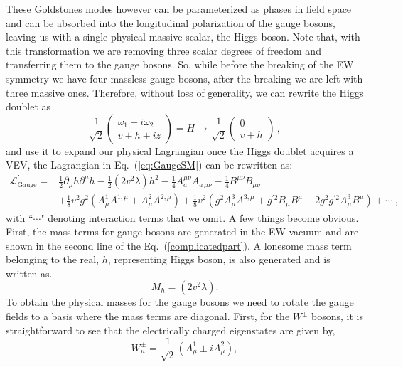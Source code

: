 \documentclass[10pt]{report}
\begin{document}
These Goldstones modes however can be parameterized as phases in field space and can be absorbed into  the longitudinal polarization of the gauge bosons, leaving us with a single physical massive scalar, the Higgs boson. 
%
Note that, with this transformation we are removing three scalar degrees of freedom and transferring them to the gauge bosons.
%
So, while before the breaking of the EW symmetry we have four massless gauge bosons, after the breaking we are left with three massive ones.
%
Therefore, without loss of generality, we can rewrite the Higgs doublet as
%
\begin{equation} 
\frac{1}{\sqrt{2}}
\begin{pmatrix}
\omega_1 + i \omega_2 \\ 
v + h + i z 
\end{pmatrix} = H  \rightarrow  \frac{1}{\sqrt{2}} \begin{pmatrix}
0 \\ 
v + h 
\end{pmatrix} \, ,
\label{shame}
\end{equation}
and use it to expand our physical Lagrangian once the Higgs doublet acquires a VEV, the Lagrangian in Eq.~(\ref{eq:GaugeSM}) can be rewritten as:
%
\begin{align}
\mathcal{L}_{\text{Gauge}}^\prime = & \frac{1}{2} \partial_\mu h \partial^\mu h - \frac{1}{2} (2v^2 \lambda) h^2
- \frac{1}{4}  A^{\mu \nu}_a A_{a \, \mu \nu}  
- \frac{1}{4}  B^{\mu \nu} B_{\mu \nu}  \nonumber \\
& + \frac{1}{8} v^2 g^2 (A^1_\mu A^{1,\mu}+ A^2_\mu A^{2,\mu}) +  \frac{1}{8} v^2  (g^2  A^3_\mu A^{3,\mu} + g^{\prime 2} B_\mu B^\mu - 2 g^2 g^{\prime 2} A^3_\mu B^\mu ) + \cdots  \ , 
\label{complicatedpart}
\end{align}
with ``$\cdots$" denoting interaction terms that we omit. 
%
A few things become obvious.
%
First, the mass terms for gauge bosons are generated in the EW vacuum and are shown in the second line of the Eq.~(\ref{complicatedpart}). A lonesome mass term belonging to the real, $h$,  representing Higgs boson, is also generated and is written as.  
%
\begin{equation}
M_h= (2v^2 \lambda).  
\end{equation}
%
To obtain the physical masses for the gauge bosons we need to rotate the gauge fields to a basis where the mass terms are diagonal. First, for the $W^\pm$ bosons, it is straightforward to see that the electrically charged eigenstates are given by, 
\begin{equation}
W^\pm_\mu = \frac{1}{\sqrt{2}} (A^{1}_\mu \pm i A^{2}_\mu) , 
\label{gagestate}
\end{equation}
\end{document}
